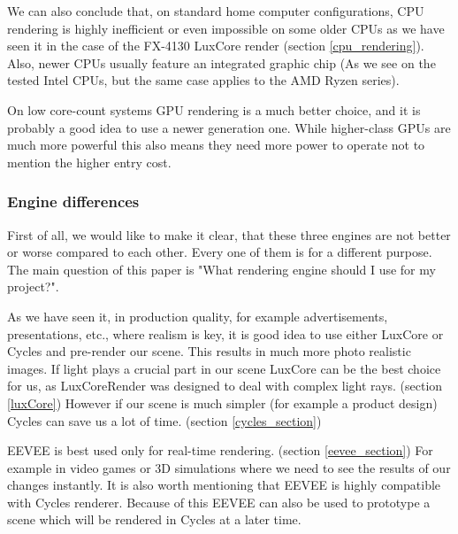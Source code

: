 \documentclass[conference]{IEEEtran}
\begin{document}
    We can also conclude that, on standard home computer configurations, CPU rendering is highly inefficient or even impossible on some older CPUs as we have seen it in the case of the FX-4130 LuxCore render (section \ref{cpu_rendering}). Also, newer CPUs usually feature an integrated graphic chip (As we see on the tested Intel CPUs, but the same case applies to the AMD Ryzen series).

    
    On low core-count systems GPU rendering is a much better choice, and it is probably a good idea to use a newer generation one. While higher-class GPUs are much more powerful this also means they need more power to operate not to mention the higher entry cost.

\subsubsection{Engine differences}
    First of all, we would like to make it clear, that these three engines are not better or worse compared to each other. Every one of them is for a different purpose. The main question of this paper is "What rendering engine should I use for my project?".
    
    As we have seen it, in production quality, for example advertisements, presentations, etc., where realism is key, it is good idea to use either LuxCore or Cycles and pre-render our scene. This results in much more photo realistic images. If light plays a crucial part in our scene LuxCore can be the best choice for us, as LuxCoreRender was designed to deal with complex light rays. (section \ref{luxCore}) However if our scene is much simpler (for example a product design) Cycles can save us a lot of time. (section \ref{cycles_section})
    
    EEVEE is best used only for real-time rendering. (section \ref{eevee_section}) For example in video games or 3D simulations where we need to see the results of our changes instantly. It is also worth mentioning that EEVEE is highly compatible with Cycles renderer. Because of this EEVEE can also be used to prototype a scene which will be rendered in Cycles at a later time.
    \newpage




\end{document}
